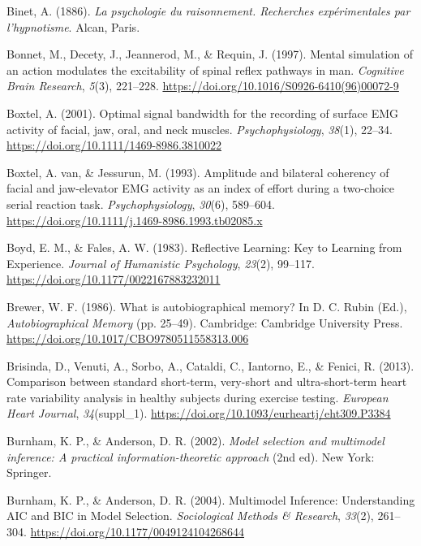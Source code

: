 \documentclass[a4paper,12pt,twoside,openright,oldfontcommands]{memoir}
\begin{document}
\hypertarget{ref-binet_psychologie_1886}{}
Binet, A. (1886). \emph{La psychologie du raisonnement. Recherches
expérimentales par l'hypnotisme}. Alcan, Paris.

\hypertarget{ref-bonnet_mental_1997}{}
Bonnet, M., Decety, J., Jeannerod, M., \& Requin, J. (1997). Mental
simulation of an action modulates the excitability of spinal reflex
pathways in man. \emph{Cognitive Brain Research}, \emph{5}(3), 221--228.
\url{https://doi.org/10.1016/S0926-6410(96)00072-9}

\hypertarget{ref-boxtel_optimal_2001}{}
Boxtel, A. (2001). Optimal signal bandwidth for the recording of surface
EMG activity of facial, jaw, oral, and neck muscles.
\emph{Psychophysiology}, \emph{38}(1), 22--34.
\url{https://doi.org/10.1111/1469-8986.3810022}

\hypertarget{ref-van_boxtel_amplitude_1993}{}
Boxtel, A. van, \& Jessurun, M. (1993). Amplitude and bilateral
coherency of facial and jaw-elevator EMG activity as an index of effort
during a two-choice serial reaction task. \emph{Psychophysiology},
\emph{30}(6), 589--604.
\url{https://doi.org/10.1111/j.1469-8986.1993.tb02085.x}

\hypertarget{ref-boyd_reflective_1983}{}
Boyd, E. M., \& Fales, A. W. (1983). Reflective Learning: Key to
Learning from Experience. \emph{Journal of Humanistic Psychology},
\emph{23}(2), 99--117. \url{https://doi.org/10.1177/0022167883232011}

\hypertarget{ref-rubin_what_1986}{}
Brewer, W. F. (1986). What is autobiographical memory? In D. C. Rubin
(Ed.), \emph{Autobiographical Memory} (pp. 25--49). Cambridge: Cambridge
University Press. \url{https://doi.org/10.1017/CBO9780511558313.006}

\hypertarget{ref-brisinda_comparison_2013}{}
Brisinda, D., Venuti, A., Sorbo, A., Cataldi, C., Iantorno, E., \&
Fenici, R. (2013). Comparison between standard short-term, very-short
and ultra-short-term heart rate variability analysis in healthy subjects
during exercise testing. \emph{European Heart Journal},
\emph{34}(suppl\_1).
\url{https://doi.org/10.1093/eurheartj/eht309.P3384}

\hypertarget{ref-burnham_model_2002}{}
Burnham, K. P., \& Anderson, D. R. (2002). \emph{Model selection and
multimodel inference: A practical information-theoretic approach} (2nd
ed). New York: Springer.

\hypertarget{ref-burnham_multimodel_2004}{}
Burnham, K. P., \& Anderson, D. R. (2004). Multimodel Inference:
Understanding AIC and BIC in Model Selection. \emph{Sociological Methods
\& Research}, \emph{33}(2), 261--304.
\url{https://doi.org/10.1177/0049124104268644}
\end{document}
